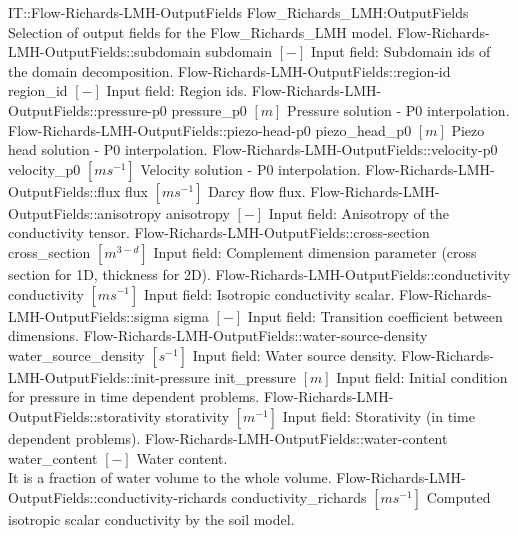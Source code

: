 \begin{SelectionType}
	{IT::Flow-Richards-LMH-OutputFields}
	{Flow{\_}Richards{\_}LMH:OutputFields}
	{{{Selection of output fields for the Flow{\_}Richards{\_}LMH model.}%
}}
		\SelectionItem
			{Flow-Richards-LMH-OutputFields::subdomain}
			{subdomain}
			{{{}{$[-]$}{ Input field: Subdomain ids of the domain decomposition.}%
}}
		\SelectionItem
			{Flow-Richards-LMH-OutputFields::region-id}
			{region{\_}id}
			{{{}{$[-]$}{ Input field: Region ids.}%
}}
		\SelectionItem
			{Flow-Richards-LMH-OutputFields::pressure-p0}
			{pressure{\_}p0}
			{{{}{$[m]$}{ Pressure solution - P0 interpolation.}%
}}
		\SelectionItem
			{Flow-Richards-LMH-OutputFields::piezo-head-p0}
			{piezo{\_}head{\_}p0}
			{{{}{$[m]$}{ Piezo head solution - P0 interpolation.}%
}}
		\SelectionItem
			{Flow-Richards-LMH-OutputFields::velocity-p0}
			{velocity{\_}p0}
			{{{}{$[ms^{-1}]$}{ Velocity solution - P0 interpolation.}%
}}
		\SelectionItem
			{Flow-Richards-LMH-OutputFields::flux}
			{flux}
			{{{}{$[ms^{-1}]$}{ Darcy flow flux.}%
}}
		\SelectionItem
			{Flow-Richards-LMH-OutputFields::anisotropy}
			{anisotropy}
			{{{}{$[-]$}{ Input field: Anisotropy of the conductivity tensor.}%
}}
		\SelectionItem
			{Flow-Richards-LMH-OutputFields::cross-section}
			{cross{\_}section}
			{{{}{$[m^{3-d}]$}{ Input field: Complement dimension parameter (cross section for 1D, thickness for 2D).}%
}}
		\SelectionItem
			{Flow-Richards-LMH-OutputFields::conductivity}
			{conductivity}
			{{{}{$[ms^{-1}]$}{ Input field: Isotropic conductivity scalar.}%
}}
		\SelectionItem
			{Flow-Richards-LMH-OutputFields::sigma}
			{sigma}
			{{{}{$[-]$}{ Input field: Transition coefficient between dimensions.}%
}}
		\SelectionItem
			{Flow-Richards-LMH-OutputFields::water-source-density}
			{water{\_}source{\_}density}
			{{{}{$[s^{-1}]$}{ Input field: Water source density.}%
}}
		\SelectionItem
			{Flow-Richards-LMH-OutputFields::init-pressure}
			{init{\_}pressure}
			{{{}{$[m]$}{ Input field: Initial condition for pressure in time dependent problems.}%
}}
		\SelectionItem
			{Flow-Richards-LMH-OutputFields::storativity}
			{storativity}
			{{{}{$[m^{-1}]$}{ Input field: Storativity (in time dependent problems).}%
}}
		\SelectionItem
			{Flow-Richards-LMH-OutputFields::water-content}
			{water{\_}content}
			{{{}{$[-]$}{ Water content.}\\{
                It is a fraction of water volume to the whole volume.}%
}}
		\SelectionItem
			{Flow-Richards-LMH-OutputFields::conductivity-richards}
			{conductivity{\_}richards}
			{{{}{$[ms^{-1}]$}{ Computed isotropic scalar conductivity by the soil model.}%
}}
\end{SelectionType}
